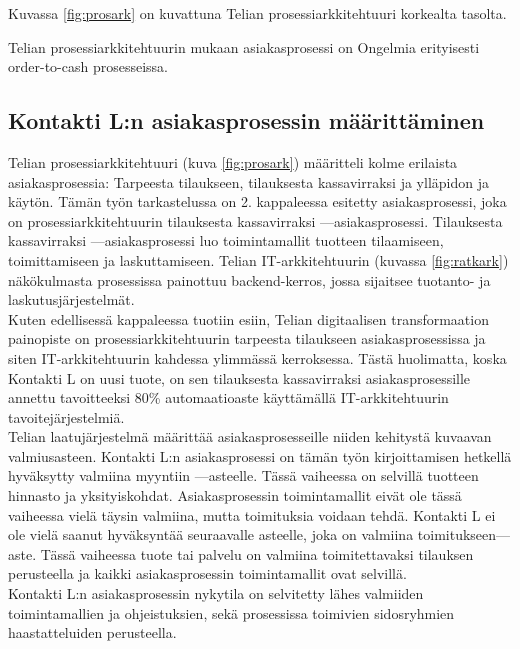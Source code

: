 \documentclass[finnish,12pt,a4paper,pdftex]{article}
\begin{document}
Kuvassa \ref{fig:prosark} on kuvattuna Telian prosessiarkkitehtuuri korkealta tasolta. 


Telian prosessiarkkitehtuurin mukaan asiakasprosessi on 
Ongelmia erityisesti order-to-cash prosesseissa.

\subsection{Kontakti L:n asiakasprosessin määrittäminen}

Telian prosessiarkkitehtuuri (kuva \ref{fig:prosark}) määritteli kolme erilaista asiakasprosessia: Tarpeesta tilaukseen, tilauksesta kassavirraksi ja ylläpidon ja käytön. Tämän työn tarkastelussa on 2. kappaleessa esitetty asiakasprosessi, joka on prosessiarkkitehtuurin tilauksesta kassavirraksi —asiakasprosessi. Tilauksesta kassavirraksi —asiakasprosessi luo toimintamallit tuotteen tilaamiseen, toimittamiseen ja laskuttamiseen. Telian IT-arkkitehtuurin (kuvassa \ref{fig:ratkark}) näkökulmasta prosessissa painottuu backend-kerros, jossa sijaitsee tuotanto- ja laskutusjärjestelmät.\\

Kuten edellisessä kappaleessa tuotiin esiin, Telian digitaalisen transformaation painopiste on prosessiarkkitehtuurin tarpeesta tilaukseen asiakasprosessissa ja siten IT-arkkitehtuurin kahdessa ylimmässä kerroksessa. Tästä huolimatta, koska Kontakti L on uusi tuote, on sen tilauksesta kassavirraksi asiakasprosessille annettu tavoitteeksi 80\% automaatioaste käyttämällä IT-arkkitehtuurin tavoitejärjestelmiä.\\

Telian laatujärjestelmä määrittää asiakasprosesseille niiden kehitystä kuvaavan valmiusasteen. Kontakti L:n asiakasprosessi on tämän työn kirjoittamisen hetkellä hyväksytty valmiina myyntiin —asteelle. Tässä vaiheessa on selvillä tuotteen hinnasto ja yksityiskohdat. Asiakasprosessin toimintamallit eivät ole tässä vaiheessa vielä täysin valmiina, mutta toimituksia voidaan tehdä. Kontakti L ei ole vielä saanut hyväksyntää seuraavalle asteelle, joka on valmiina toimitukseen—aste. Tässä vaiheessa tuote tai palvelu on valmiina toimitettavaksi tilauksen perusteella ja kaikki asiakasprosessin toimintamallit ovat selvillä.\\

Kontakti L:n asiakasprosessin nykytila on selvitetty lähes valmiiden toimintamallien ja ohjeistuksien, sekä prosessissa toimivien sidosryhmien haastatteluiden perusteella.
\end{document}
